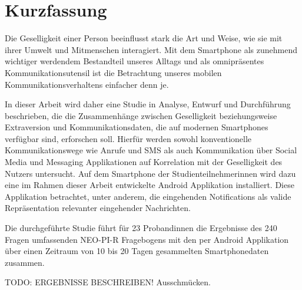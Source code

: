 
\chapter*{Kurzfassung}
\label{ch:GermanAbstract}

Die Geselligkeit einer Person beeinflusst stark die Art und Weise, wie sie mit ihrer Umwelt und Mitmenschen interagiert. 
Mit dem Smartphone als zunehmend wichtiger werdendem Bestandteil unseres Alltags und als omnipräsentes Kommunikationsutensil ist 
die Betrachtung unseres mobilen Kommunikationsverhaltens einfacher denn je. 
\par
In dieser Arbeit wird daher eine Studie in Analyse, Entwurf und Durchführung beschrieben, die die Zusammenhänge zwischen Geselligkeit beziehungsweise Extraversion und Kommunikationsdaten, die auf modernen Smartphones verfügbar sind, erforschen soll. 
Hierfür werden sowohl konventionelle Kommunikationswege wie Anrufe und SMS als auch Kommunikation über Social Media und Messaging Applikationen auf Korrelation mit der Geselligkeit des Nutzers untersucht.
Auf dem Smartphone der Studienteilnehmerinnen wird dazu eine im Rahmen dieser Arbeit entwickelte Android Applikation installiert.
Diese Applikation betrachtet, unter anderem, die eingehenden Notifications als valide Repräsentation relevanter eingehender Nachrichten.
\par
Die durchgeführte Studie führt für 23 Probandinnen die Ergebnisse des 240 Fragen umfassenden NEO-PI-R Fragebogens mit den per Android Applikation über einen Zeitraum von 10 bis 20 Tagen gesammelten Smartphonedaten zusammen.
\par
TODO: ERGEBNISSE BESCHREIBEN! Ausschmücken.
 



